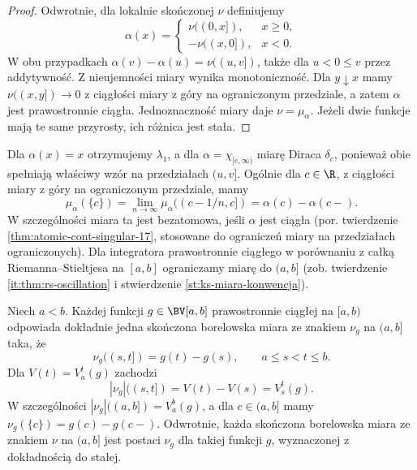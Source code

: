 \begin{proof}
Odwrotnie, dla lokalnie skończonej $\nu$ definiujemy
\[
 \alpha(x)=
 \begin{cases}
 \nu((0,x]),&x\ge0,\\
 -\nu((x,0]),&x<0.
 \end{cases}
\]
W obu przypadkach $\alpha(v)-\alpha(u)=\nu((u,v])$, także dla $u<0\le v$ przez addytywność. Z nieujemności miary wynika monotoniczność. Dla $y\downarrow x$ mamy $\nu((x,y])\to0$ z ciągłości miary z góry na ograniczonym przedziale, a zatem $\alpha$ jest prawostronnie ciągła. Jednoznaczność miary daje $\nu=\mu_\alpha$. Jeżeli dwie funkcje mają te same przyrosty, ich różnica jest stała.
\end{proof}
Dla $\alpha(x)=x$ otrzymujemy $\lambda_1$, a dla $\alpha=\chi_{[c,\infty)}$ miarę Diraca $\delta_c$, ponieważ obie spełniają właściwy wzór na przedziałach $(u,v]$. Ogólnie dla $c\in\R$, z ciągłości miary z góry na ograniczonym przedziale, mamy
\[
 \mu_\alpha(\{c\})=\lim_{n\to\infty}\mu_\alpha((c-1/n,c])
 =\alpha(c)-\alpha(c-).
\]
W szczególności miara ta jest bezatomowa, jeśli $\alpha$ jest ciągła (por. twierdzenie \ref{thm:atomic-cont-singular-17}, stosowane do ograniczeń miary na przedziałach ograniczonych). Dla integratora prawostronnie ciągłego w porównaniu z całką Riemanna--Stieltjesa na $[a,b]$ ograniczamy miarę do $(a,b]$ (zob. twierdzenie \ref{it:thm:rs-oscillation} i stwierdzenie \ref{st:ks-miara-konwencja}).
\begin{twierdzenie}
\label{it:thm:stieltjes-signed-bv}
Niech $a<b$. Każdej funkcji $g\in\BV[a,b]$
prawostronnie ciągłej na $[a,b)$ odpowiada dokładnie
jedna skończona borelowska miara ze znakiem $\nu_g$
na $(a,b]$ taka, że
\[
 \nu_g((s,t])=g(t)-g(s),\qquad a\le s<t\le b.
\]
Dla $V(t)=V_a^t(g)$ zachodzi
\[
 |\nu_g|((s,t])=V(t)-V(s)=V_s^t(g).
\]
W szczególności $|\nu_g|((a,b])=V_a^b(g)$,
a dla $c\in(a,b]$ mamy
$\nu_g(\{c\})=g(c)-g(c-)$.
Odwrotnie, każda skończona borelowska miara ze znakiem
$\nu$ na $(a,b]$ jest postaci $\nu_g$ dla takiej
funkcji $g$, wyznaczonej z dokładnością do stałej.
\end{twierdzenie}
